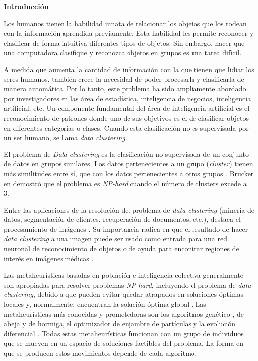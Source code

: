 {}
\begin{center}
	{\bf Introducción} 
\label{chap:intro}
\end{center}

    Los humanos tienen la habilidad innata de relacionar los objetos que los
rodean con la información aprendida previamente. Esta habilidad les permite 
reconocer y clasificar de forma intuitiva di\-fe\-ren\-tes tipos de objetos. Sin
embargo, hacer que una computadora clasifique y reconozca objetos en grupos es
una tarea difícil.

    A medida que aumenta la cantidad de información con la que tienen que lidiar
los seres humanos, también crece la necesidad de poder procesarla y clasificarla
de manera automática. Por lo tanto, este problema ha sido ampliamente abordado
por investigadores en las área de estadística, inteligencia de negocios,
inteligencia artificial, etc\cite{SwAjAm2009}. Un componente fundamental
del área de inteligencia artificial es el reconocimiento de patrones donde uno de
sus objetivos es el de clasificar objetos en diferentes categorías o clases. Cuando
esta clasificación no es supervisada por un ser humano, se llama \emph{data
clustering}.

    El problema de \emph{Data clustering} es la clasificación no supervisada de
un conjunto de datos en grupos similares. Los datos pertenecientes a un grupo
(\emph{cluster}) tienen más similitudes entre sí, que con los datos pertenecientes
a otros grupos \cite{GaChJi2007}. Brucker en \cite{Br1978} demostró que el
problema es \emph{NP-hard} cuando el número de clusters excede a 3.

    Entre las aplicaciones de la resolución del problema de \emph{data clustering}
(minería de datos, segmentación de clientes, recuperación de documentos, etc.),
destaca el procesamiento de imágenes \cite{GaChJi2007}. Su importancia radica en
que el resultado de hacer \emph{data clustering} a una imagen puede ser usado
como entrada para una red neuronal de reconocimiento de objetos o de ayuda para
encontrar regiones de interés en imágenes médicas \cite{GaChJi2007}.

    Las metaheurísticas basadas en población e inteligencia colectiva
generalmente son apropiadas para resolver problemas \emph{NP-hard}, incluyendo
el problema de \emph{data clustering}, debido a que pueden evitar quedar atrapados
en soluciones óptimas locales y, normalmente, encuentran la solución óptima global
\cite{PSO_0}. Las metaheurísticas más conocidas y prometedoras son los algoritmos
genético \cite{DoGeGr2007}, de abeja\cite{BEE_0} y de hormiga\cite{Ant_0}\cite{OuBa2007},
el optimizador de enjambre de partículas \cite{PSO_0} y la evolución diferencial
\cite{SwAjAm2008}. Todas estas metaheurísticas funcionan con un grupo de individuos
que se mueven en un espacio de soluciones factibles del problema. La forma en
que se producen estos movimientos depende de cada algoritmo.

